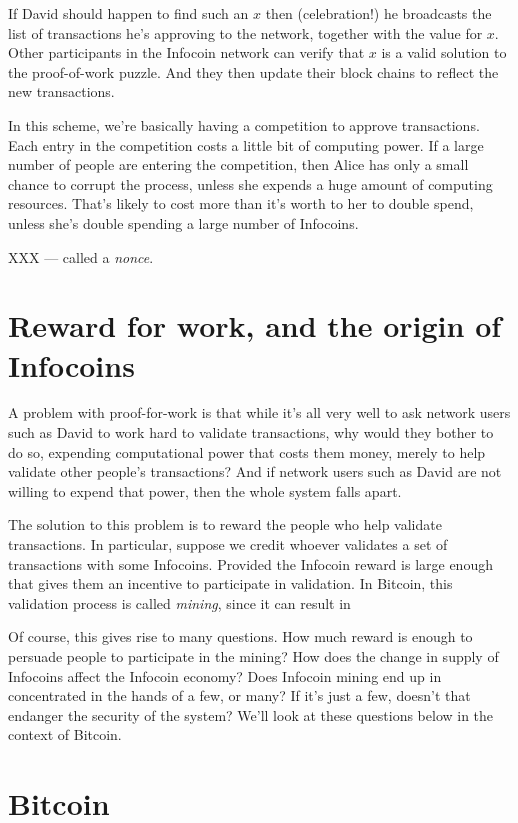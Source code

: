 \documentclass[12pt]{book}
\newcounter{problem}[chapter]
\begin{document}
If David should happen to find such an $x$ then (celebration!)  he
broadcasts the list of transactions he's approving to the network,
together with the value for $x$.  Other participants in the Infocoin
network can verify that $x$ is a valid solution to the proof-of-work
puzzle.  And they then update their block chains to reflect the new
transactions.

In this scheme, we're basically having a competition to approve
transactions.  Each entry in the competition costs a little bit of
computing power.  If a large number of people are entering the
competition, then Alice has only a small chance to corrupt the
process, unless she expends a huge amount of computing resources.
That's likely to cost more than it's worth to her to double spend,
unless she's double spending a large number of Infocoins.

XXX --- called a \emph{nonce}.  

\section{Reward for work, and the origin of Infocoins}

A problem with proof-for-work is that while it's all very well to ask
network users such as David to work hard to validate transactions, why
would they bother to do so, expending computational power that costs
them money, merely to help validate other people's transactions?  And
if network users such as David are not willing to expend that power,
then the whole system falls apart.

The solution to this problem is to reward the people who help validate
transactions.  In particular, suppose we credit whoever validates a
set of transactions with some Infocoins.  Provided the Infocoin reward
is large enough that gives them an incentive to participate in
validation.  In Bitcoin, this validation process is called
\emph{mining}, since it can result in 

Of course, this gives rise to many questions.  How much reward is
enough to persuade people to participate in the mining?  How does the
change in supply of Infocoins affect the Infocoin economy?  Does
Infocoin mining end up in concentrated in the hands of a few, or many?
If it's just a few, doesn't that endanger the security of the system?
We'll look at these questions below in the context of Bitcoin.

\section{Bitcoin}
\end{document}
